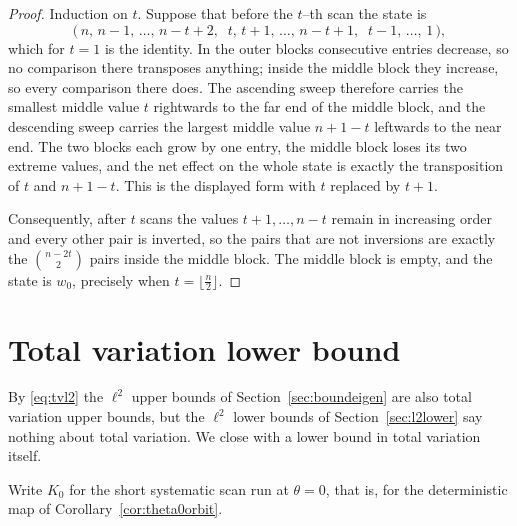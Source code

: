 \documentclass[11pt]{article}
\theoremstyle{plain}  %
\newtheorem{remark}[theorem]{Remark}
\begin{document}
\begin{proof}
Induction on $t$. Suppose that before the $t$--th scan the state is
$$
  \bigl(\,n,\, n-1,\, \dots,\, n-t+2,\;\; t,\, t+1,\, \dots,\, n-t+1,\;\;
          t-1,\, \dots,\, 1\,\bigr),
$$
which for $t=1$ is the identity. In the outer blocks consecutive entries decrease, so no
comparison there transposes anything; inside the middle block they increase, so every
comparison there does. The ascending sweep therefore carries the smallest middle value $t$
rightwards to the far end of the middle block, and the descending sweep carries the largest
middle value $n+1-t$ leftwards to the near end. The two blocks each grow by one entry, the
middle block loses its two extreme values, and the net effect on the whole state is exactly
the transposition of $t$ and $n+1-t$. This is the displayed form with $t$ replaced by
$t+1$.

Consequently, after $t$ scans the values $t+1,\dots,n-t$ remain in increasing order and
every other pair is inverted, so the pairs that are not inversions are exactly the
$\binom{n-2t}{2}$ pairs inside the middle block. The middle block is empty, and the state
is $w_0$, precisely when $t = \lfloor \frac{n}{2}\rfloor$.
\end{proof}










\section{Total variation lower bound}\label{sec:l1lower}

By \eqref{eq:tvl2} the $\ell^{2}$ upper bounds of Section~\ref{sec:boundeigen} are also total
variation upper bounds, but the $\ell^{2}$ lower bounds of Section~\ref{sec:l2lower} say
nothing about total variation. We close with a lower bound in total variation itself.

Write $K_0$ for the short systematic scan run at $\theta = 0$, that is, for the
deterministic map of Corollary~\ref{cor:theta0orbit}.
\end{document}
